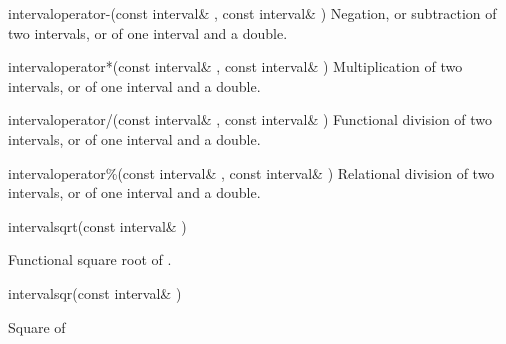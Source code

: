 \documentclass{manual}
\begin{document}
\begin{deffun}{interval}{operator-}{(const interval\& , const interval\& )}
  Negation, or subtraction of two intervals, or of one interval and a double.
\end{deffun}


\begin{deffun}{interval}{operator*}{(const interval\& , const interval\& )}
  Multiplication of two intervals, or of one interval and a double.
\end{deffun}

\begin{deffun}{interval}{operator/}{(const interval\& , const interval\& )}
  Functional division of two intervals, or of one interval and a double.
\end{deffun}

\begin{deffun}{interval}{operator\%}{(const interval\& , const interval\& )}
  Relational division of two intervals, or of one interval and a double.
\end{deffun}

\begin{deffun}{interval}{sqrt}{(const interval\& )}
  \begin{operation}
  \end{operation}
  Functional square root of .
\end{deffun}

\begin{deffun}{interval}{sqr}{(const interval\& )}
  \begin{operation}
  \end{operation}
  Square of 
\end{deffun}
\end{document}
